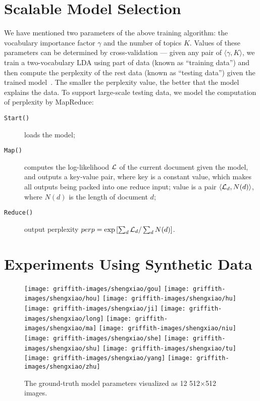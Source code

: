 \section{Scalable Model Selection}
\label{sec:model_select}

We have mentioned two parameters of the above training algorithm: the
vocabulary importance factor $\gamma$ and the number of topics $K$.
Values of these parameters can be determined by cross-validation ---
given any pair of $\langle{\gamma,K}\rangle$, we train a
two-vocabulary LDA using part of data (known as ``training data'') and
then compute the perplexity of the rest data (known as ``testing
data'') given the trained model~\cite{heinrich}.  The smaller the
perplexity value, the better that the model explains the data.  To
support large-scale testing data, we model the computation of
perplexity by MapReduce:
\begin{description}
\item[\texttt{Start()}] loads the model;
\item[\texttt{Map()}] computes the log-likelihood $\mathcal{L}$ of the current
  document given the model, and outputs a key-value pair, where key is
  a constant value, which makes all outputs being packed into one
  reduce input; value is a pair $\langle{\mathcal{L}_d,N(d)}\rangle$, where
  $N(d)$ is the length of document $d$;
\item[\texttt{Reduce()}] output perplexity
  ${perp}=\exp\left[\sum_d\mathcal{L}_d/\sum_d N(d)\right]$.
\end{description}


\section{Experiments Using Synthetic Data}

\begin{figure}[!t]
  \centering
  \texttt{[image: griffith-images/shengxiao/gou]}
  \texttt{[image: griffith-images/shengxiao/hou]}
  \texttt{[image: griffith-images/shengxiao/hu]}
  \texttt{[image: griffith-images/shengxiao/ji]}
  \texttt{[image: griffith-images/shengxiao/long]}
  \texttt{[image: griffith-images/shengxiao/ma]}
  \texttt{[image: griffith-images/shengxiao/niu]}
  \texttt{[image: griffith-images/shengxiao/she]}
  \texttt{[image: griffith-images/shengxiao/shu]}
  \texttt{[image: griffith-images/shengxiao/tu]}
  \texttt{[image: griffith-images/shengxiao/yang]}
  \texttt{[image: griffith-images/shengxiao/zhu]}
  \caption{The ground-truth model parameters visualized as 12 512$\times$512 images.}
  \label{fig:ground-truth-shengxiao}
\end{figure}

